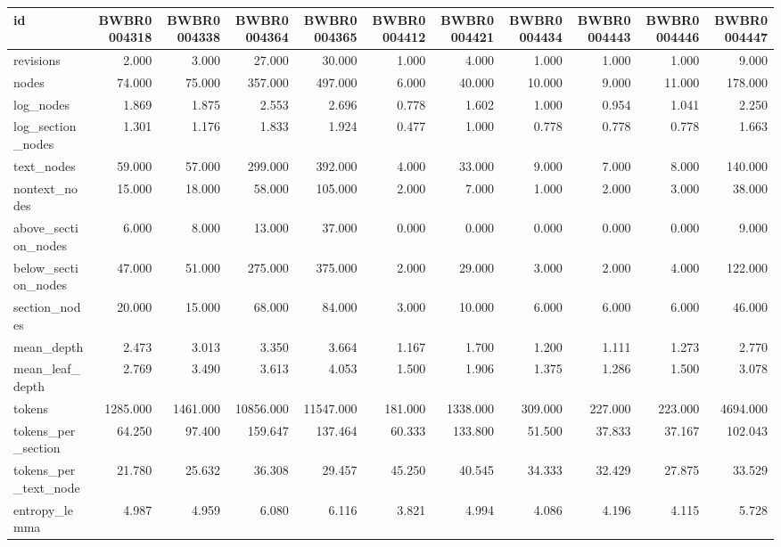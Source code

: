 \begin{tabular}{lrrrrrrrrrr}
\toprule
id & BWBR0004318 & BWBR0004338 & BWBR0004364 & BWBR0004365 & BWBR0004412 & BWBR0004421 & BWBR0004434 & BWBR0004443 & BWBR0004446 & BWBR0004447 \\
\midrule
revisions & 2.000 & 3.000 & 27.000 & 30.000 & 1.000 & 4.000 & 1.000 & 1.000 & 1.000 & 9.000 \\
\cline{1-11}
nodes & 74.000 & 75.000 & 357.000 & 497.000 & 6.000 & 40.000 & 10.000 & 9.000 & 11.000 & 178.000 \\
\cline{1-11}
log\_nodes & 1.869 & 1.875 & 2.553 & 2.696 & 0.778 & 1.602 & 1.000 & 0.954 & 1.041 & 2.250 \\
\cline{1-11}
log\_section\_nodes & 1.301 & 1.176 & 1.833 & 1.924 & 0.477 & 1.000 & 0.778 & 0.778 & 0.778 & 1.663 \\
\cline{1-11}
text\_nodes & 59.000 & 57.000 & 299.000 & 392.000 & 4.000 & 33.000 & 9.000 & 7.000 & 8.000 & 140.000 \\
\cline{1-11}
nontext\_nodes & 15.000 & 18.000 & 58.000 & 105.000 & 2.000 & 7.000 & 1.000 & 2.000 & 3.000 & 38.000 \\
\cline{1-11}
above\_section\_nodes & 6.000 & 8.000 & 13.000 & 37.000 & 0.000 & 0.000 & 0.000 & 0.000 & 0.000 & 9.000 \\
\cline{1-11}
below\_section\_nodes & 47.000 & 51.000 & 275.000 & 375.000 & 2.000 & 29.000 & 3.000 & 2.000 & 4.000 & 122.000 \\
\cline{1-11}
section\_nodes & 20.000 & 15.000 & 68.000 & 84.000 & 3.000 & 10.000 & 6.000 & 6.000 & 6.000 & 46.000 \\
\cline{1-11}
mean\_depth & 2.473 & 3.013 & 3.350 & 3.664 & 1.167 & 1.700 & 1.200 & 1.111 & 1.273 & 2.770 \\
\cline{1-11}
mean\_leaf\_depth & 2.769 & 3.490 & 3.613 & 4.053 & 1.500 & 1.906 & 1.375 & 1.286 & 1.500 & 3.078 \\
\cline{1-11}
tokens & 1285.000 & 1461.000 & 10856.000 & 11547.000 & 181.000 & 1338.000 & 309.000 & 227.000 & 223.000 & 4694.000 \\
\cline{1-11}
tokens\_per\_section & 64.250 & 97.400 & 159.647 & 137.464 & 60.333 & 133.800 & 51.500 & 37.833 & 37.167 & 102.043 \\
\cline{1-11}
tokens\_per\_text\_node & 21.780 & 25.632 & 36.308 & 29.457 & 45.250 & 40.545 & 34.333 & 32.429 & 27.875 & 33.529 \\
\cline{1-11}
entropy\_lemma & 4.987 & 4.959 & 6.080 & 6.116 & 3.821 & 4.994 & 4.086 & 4.196 & 4.115 & 5.728 \\

\end{tabular}
